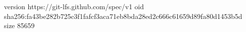 version https://git-lfs.github.com/spec/v1
oid sha256:fa43be282b725c3f1fafcf3aca71eb8bda28ed2c666c61659d89fa80d1453b5d
size 85659

